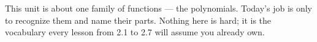 \documentclass[10pt]{article}
\begin{document}
\vspace{0.14in}

\begin{remindbox}
\small
This unit is about one family of functions --- the polynomials. Today's job is only
to recognize them and name their parts. Nothing here is hard; it is the vocabulary
every lesson from 2.1 to 2.7 will assume you already own.
\end{remindbox}
\end{document}
